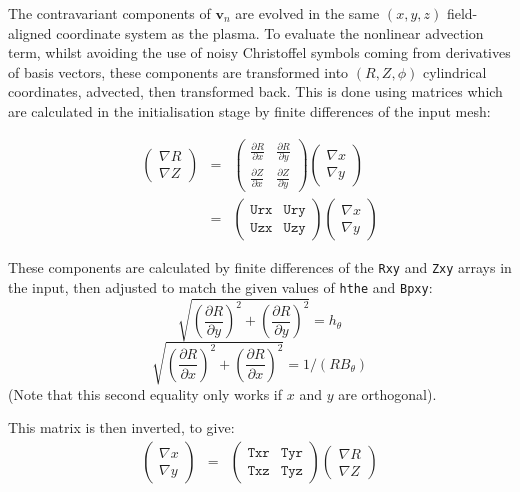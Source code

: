 \documentclass[12pt,a4paper]{article}
\begin{document}
The contravariant components of $\mathbf{v}_n$ are evolved in the same $\left(x,y,z\right)$ field-aligned coordinate system as the plasma. 
To evaluate the nonlinear advection term, whilst avoiding
the use of noisy Christoffel symbols coming from derivatives of basis vectors, these components are transformed into $\left(R,Z,\phi\right)$ cylindrical coordinates, advected, then transformed back. This is done using matrices which are calculated in the initialisation stage by finite differences of the input mesh:

\begin{eqnarray}
  \left(\begin{array}{c}
\nabla R \\
\nabla Z\end{array}\right) &=& \left(\begin{array}{cc}
\frac{\partial R}{\partial x} & \frac{\partial R}{\partial y} \\
\frac{\partial Z}{\partial x} & \frac{\partial Z}{\partial y}\end{array}\right)\left(\begin{array}{c}
\nabla x \\
\nabla y\end{array}\right) \\
&=& \left(\begin{array}{cc}
\texttt{Urx} & \texttt{Ury} \\
\texttt{Uzx} & \texttt{Uzy} \end{array}\right)\left(\begin{array}{c}
\nabla x \\
\nabla y\end{array}\right)
\end{eqnarray}

These components are calculated by finite differences of the
\texttt{Rxy} and \texttt{Zxy} arrays in the input, then adjusted to
match the given values of \texttt{hthe} and \texttt{Bpxy}:
\[
\sqrt{\left(\frac{\partial R}{\partial y}\right)^2 + \left(\frac{\partial R}{\partial y}\right)^2} = h_\theta
\]
\[
\sqrt{\left(\frac{\partial R}{\partial x}\right)^2 + \left(\frac{\partial R}{\partial x}\right)^2} = 1 / \left(R B_\theta\right)
\]
(Note that this second equality only works if $x$ and $y$ are orthogonal).

This matrix is then inverted, to give:
\begin{eqnarray}
  \left(\begin{array}{c}
\nabla x \\
\nabla y\end{array}\right) &=& \left(\begin{array}{cc}
\texttt{Txr} & \texttt{Tyr} \\
\texttt{Txz} & \texttt{Tyz} \end{array}\right)\left(\begin{array}{c}
\nabla R \\
\nabla Z\end{array}\right)
\end{eqnarray}
\end{document}
